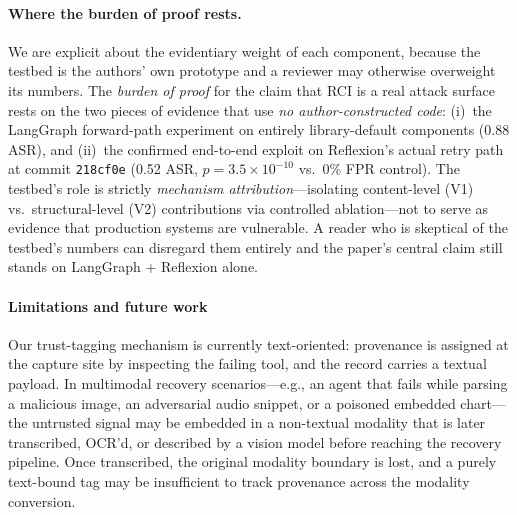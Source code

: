 \paragraph{Where the burden of proof rests.}
We are explicit about the evidentiary weight of each component, because the testbed is the authors' own prototype and a reviewer may otherwise overweight its numbers. The \emph{burden of proof} for the claim that RCI is a real attack surface rests on the two pieces of evidence that use \emph{no author-constructed code}: (i)~the LangGraph forward-path experiment on entirely library-default  components (0.88 ASR), and (ii)~the confirmed end-to-end exploit on Reflexion's actual  retry path at commit \texttt{218cf0e} (0.52 ASR, $p = 3.5 \times 10^{-10}$ vs.\ 0\% FPR control). The \system{} testbed's role is strictly \emph{mechanism attribution}---isolating content-level (V1) vs.\ structural-level (V2) contributions via controlled ablation---not to serve as evidence that production systems are vulnerable. A reader who is skeptical of the testbed's numbers can disregard them entirely and the paper's central claim still stands on LangGraph + Reflexion alone.

\paragraph{Limitations and future work}
Our trust-tagging mechanism is currently text-oriented: provenance is assigned at the capture site by inspecting the failing tool, and the  record carries a textual payload. In multimodal recovery scenarios---e.g., an agent that fails while parsing a malicious image, an adversarial audio snippet, or a poisoned embedded chart---the untrusted signal may be embedded in a non-textual modality that is later transcribed, OCR'd, or described by a vision model before reaching the recovery pipeline. Once transcribed, the original modality boundary is lost, and a purely text-bound  tag may be insufficient to track provenance across the modality conversion.

